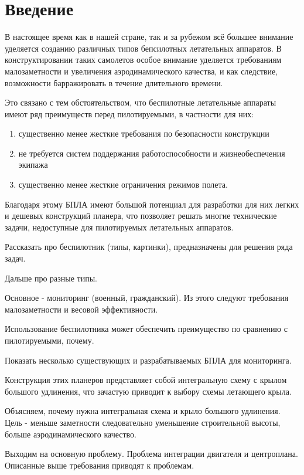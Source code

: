 \chapter*{Введение}

В настоящее время как в нашей стране, так и за рубежом всё большее внимание уделяется созданию различных типов бепсилотных летательных аппаратов. В конструктировании таких самолетов особое внимание уделяется требованиям малозаметности и увеличения аэродинамического качества, и как следствие, возможности барражировать в течение длительного времени. 

Это связано с тем обстоятельством, что беспилотные летательные аппараты имеют ряд преимуществ перед пилотируемыми, в частности для них:
\begin{enumerate}
\item существенно менее жесткие требования по безопасности конструкции
\item не требуется систем поддержания работоспособности и жизнеобеспечения экипажа
\item существенно менее жесткие ограничения режимов полета.
\end{enumerate} 

Благодаря этому БПЛА имеют большой потенциал для разработки для них легких и дешевых конструкций планера, что позволяет решать многие технические задачи, недоступные для пилотируемых летательных аппаратов.

Рассказать про беспилотник (типы, картинки), предназначены для решения ряда задач.

Дальше про разные типы.

Основное - мониторинг (военный, гражданский). Из этого следуют требования малозаметности и весовой эффективности.

Использование беспилотника может обеспечить преимущество по сравнению с пилотируемыми, почему.

Показать несколько существующих и разрабатываемых БПЛА для мониторинга.

Конструкция этих планеров представляет собой интегральную схему с крылом большого удлинения, что зачастую приводит к выбору схемы летающего крыла.

Объясняем, почему нужна интегральная схема и крыло большого удлинения. Цель - меньше заметности следовательно уменьшение строительной высоты, больше аэродинамического качество.

Выходим на основную проблему. Проблема интеграции двигателя и центроплана. Описанные выше требования приводят к проблемам. 

